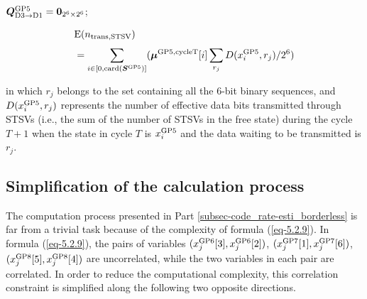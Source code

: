 \documentclass[lettersize,journal]{IEEEtran}
\begin{document}
\begin{algorithm}
	\caption{Calculating the transition probability transition matrix $\boldsymbol{Q}_{\rm D3\to D1}^{\rm GP5}$ of the STSVs S1$\sim$S6 from cycle $T$ to cycle $T+1$.}
	\label{alg-5.2.1}
	\DontPrintSemicolon
		$\boldsymbol{Q}_{\rm D3\to D1}^{\rm GP5} = \boldsymbol{0}_{2^6\times 2^6}$;\\
		
	\end{algorithm}


\begin{equation}
	\begin{aligned}
		&{\rm E}(n_{\rm trans,STSV}) \\
		&=\sum_{i\in [0,{\rm card}(\boldsymbol{S}^{\rm GP5})]}^{} (\boldsymbol{\mu}^{\rm GP5, cycleT}[i] \sum_{r_j}^{}D(x_i^{\rm GP5}, r_j)/2^6)	
	\end{aligned}
	\label{eq-5.2.11}
\end{equation}

\noindent in which $r_j$ belongs to the set containing all the 6-bit binary sequences, and $D(x_i^{\rm GP5}, r_j)$ represents the number of effective data bits transmitted through STSVs (i.e., the sum of the number of STSVs in the free state) during the cycle $T+1$ when the state in cycle $T$ is $x_i^{\rm GP5}$ and the data waiting to be transmitted is $r_j$. 

\subsection{Simplification of the calculation process}\label{subsec-code_rate-further_simp}

The computation process presented in Part \ref{subsec-code_rate-esti_borderless} is far from a trivial task because of the complexity of formula (\ref{eq-5.2.9}). In formula (\ref{eq-5.2.9}), the pairs of variables $(x_j^{\rm GP6}[3], x_j^{\rm GP6}[2])$, $(x_j^{\rm GP7} [1], x_j^{\rm GP7}[6])$, $(x_j^{\rm GP8}[5], x_j^{\rm GP8}[4])$ are uncorrelated, while the two variables in each pair are correlated. In order to reduce the computational complexity, this correlation constraint is simplified along the following two opposite directions.
\end{document}
